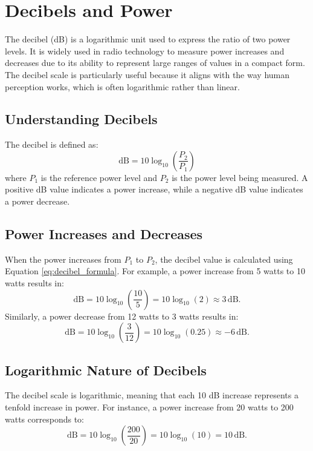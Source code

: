 \section{Decibels and Power}
\label{section:decibels_and_power}

The decibel (dB) is a logarithmic unit used to express the ratio of two power levels. It is widely used in radio technology to measure power increases and decreases due to its ability to represent large ranges of values in a compact form. The decibel scale is particularly useful because it aligns with the way human perception works, which is often logarithmic rather than linear.

\subsection*{Understanding Decibels}
The decibel is defined as:
\begin{equation}
    \text{dB} = 10 \log_{10}\left(\frac{P_2}{P_1}\right)
    \label{eq:decibel_formula}
\end{equation}
where \( P_1 \) is the reference power level and \( P_2 \) is the power level being measured. A positive dB value indicates a power increase, while a negative dB value indicates a power decrease.

\subsection*{Power Increases and Decreases}
When the power increases from \( P_1 \) to \( P_2 \), the decibel value is calculated using Equation \ref{eq:decibel_formula}. For example, a power increase from 5 watts to 10 watts results in:
\begin{equation}
    \text{dB} = 10 \log_{10}\left(\frac{10}{5}\right) = 10 \log_{10}(2) \approx 3 \, \text{dB}.
    \label{eq:power_increase_example}
\end{equation}
Similarly, a power decrease from 12 watts to 3 watts results in:
\begin{equation}
    \text{dB} = 10 \log_{10}\left(\frac{3}{12}\right) = 10 \log_{10}(0.25) \approx -6 \, \text{dB}.
    \label{eq:power_decrease_example}
\end{equation}

\subsection*{Logarithmic Nature of Decibels}
The decibel scale is logarithmic, meaning that each 10 dB increase represents a tenfold increase in power. For instance, a power increase from 20 watts to 200 watts corresponds to:
\begin{equation}
    \text{dB} = 10 \log_{10}\left(\frac{200}{20}\right) = 10 \log_{10}(10) = 10 \, \text{dB}.
    \label{eq:logarithmic_example}
\end{equation}

